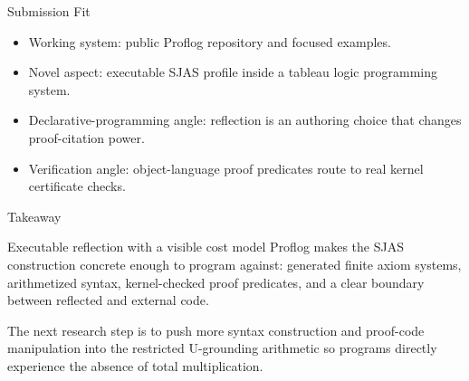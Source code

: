 \documentclass[aspectratio=169]{beamer}
\begin{document}
\begin{frame}{Submission Fit}
  \begin{itemize}
    \item Working system: public Proflog repository and focused examples.
    \item Novel aspect: executable SJAS profile inside a tableau logic
          programming system.
    \item Declarative-programming angle: reflection is an authoring choice that
          changes proof-citation power.
    \item Verification angle: object-language proof predicates route to real
          kernel certificate checks.
  \end{itemize}
\end{frame}

\begin{frame}{Takeaway}
  \begin{block}{Executable reflection with a visible cost model}
    Proflog makes the SJAS construction concrete enough to program against:
    generated finite axiom systems, arithmetized syntax, kernel-checked proof
    predicates, and a clear boundary between reflected and external code.
  \end{block}

  \vspace{0.8em}
  The next research step is to push more syntax construction and proof-code
  manipulation into the restricted U-grounding arithmetic so programs directly
  experience the absence of total multiplication.
\end{frame}
\end{document}
